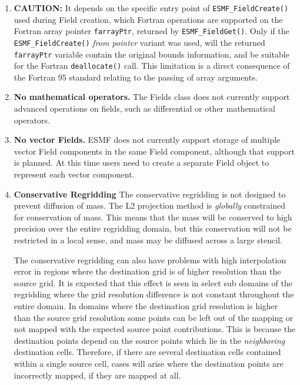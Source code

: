 

\begin{enumerate}
\label{Field:rest}

\item {\bf CAUTION:} It depends on the specific entry point of {\tt ESMF\_FieldCreate()} used during Field creation, which Fortran operations are supported on the Fortran array pointer {\tt farrayPtr}, returned by {\tt ESMF\_FieldGet()}. Only if the {\tt ESMF\_FieldCreate()} {\em from pointer} variant was used, will the returned {\tt farrayPtr} variable contain the original bounds information, and be suitable for the Fortran {\tt deallocate()} call. This limitation is a direct consequence of the Fortran 95 standard relating to the passing of array arguments.

\item {\bf No mathematical operators.}  The Fields class does not 
currently support advanced
operations on fields, such as differential or other
mathematical operators.

\item {\bf No vector Fields.}  ESMF does not currently  support storage of 
multiple vector Field components in the same Field component, although
that support is planned.  At this time users need to create a 
separate Field object to represent each vector component.

\item {\bf Conservative Regridding} 
The conservative regridding is not designed to 
prevent diffusion of mass.  The L2 projection method is {\it globally} constrained
for conservation of mass.  This means that the mass will be conserved to high precision
over the entire regridding domain, but this conservation will not be restricted
in a local sense, and mass may be diffused across a large stencil.  

The conservative regridding can also have problems 
with high interpolation error in regions where the destination grid is of higher 
resolution than the source grid.  It is expected that this effect is seen in select
sub domains of the regridding where the
grid resolution difference is not constant throughout the entire domain.  In domains
where the destination grid resolution is higher than the source grid resolution some
points can be left out of the mapping or not mapped with the expected source point 
contributions.  This is because the destination points depend on the source points 
which lie in the {\it neighboring} destination cells.  Therefore, if there are 
several destination cells contained within a single source cell, cases will arise
where the destination points are incorrectly mapped, if they are mapped at all.

\end{enumerate}
